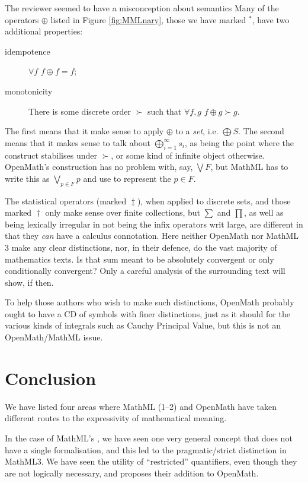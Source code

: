 \documentclass{llncs}
\begin{document}
\begin{newpart}{The reviewer seemed to have a misconception about semantics}
Many of the operators $\oplus$ listed in Figure \ref{fig:MMLnary}, those we
have marked ${}^*$, have two additional properties:
\begin{description}
\item[idempotence]$\forall f$ $f\oplus f=f$;
\item[monotonicity]There is some discrete order $\succ$ such that $\forall
f,g$ $f\oplus g\succ g$.
\end{description}
The first means that it make sense to apply $\oplus$ to a {\emph{set}}, i.e.
$\bigoplus S$. The second means that it makes sense to talk about
$\bigoplus_{i=1}^\infty s_i$, as being the point where the construct
stabilises under $\succ$, or some kind of infinite object otherwise. 
OpenMath's construction has no problem with, say, $\bigvee F$, but MathML has to
write this as $\bigvee_{p\in F}p$ and use {} to represent
the $p\in F$.
\par
The statistical operators (marked ${}\ddag$), when applied to discrete sets,
and those marked ${}\dag$ only make sense over finite collections, but $\sum$
and $\prod$, as well as being lexically irregular in not being the infix
operators writ large, are different in that they {\emph{can}} have a calculus
connotation. Here neither OpenMath nor MathML 3 make any clear distinctions,
nor, in their defence, do the vast majority of mathematics texts. Is that sum
meant to be absolutely convergent or only conditionally convergent? Only a
careful analysis of the surrounding text will show, if then.
\par
To help those authors who wish to make such distinctions, OpenMath probably
ought to have a CD of symbols with finer distinctions, just as it should for
the various kinds of integrals such as Cauchy Principal Value, but this is not
an OpenMath/MathML issue.
\section{Conclusion}
We have listed four areas where MathML (1--2) and OpenMath have taken different routes to
the expressivity of mathematical meaning.

In the case of MathML's {}, we have seen one very general concept that
does not have a single formalisation, and this led to the pragmatic/strict distinction in
MathML3. We have seen the utility of ``restricted'' quantifiers, even though they are not
logically necessary, and \cite{DavenportKohlhase2009c} proposes their addition to
OpenMath.


\end{newpart}
\end{document}
